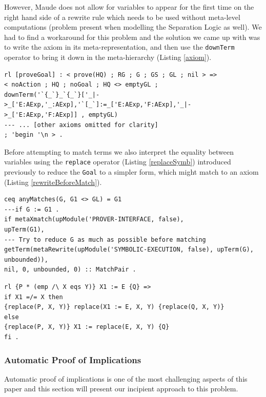\documentclass[12pt,a4paper]{article}
\begin{document}
{	
	However, Maude does not allow for variables to appear for the first time on the right hand side of a rewrite rule which needs to be used without meta-level computations (problem present when modelling the Separation Logic as well). We had to find a workaround for this problem and the solution we came up with was to write the axiom in its meta-representation, and then use the \texttt{downTerm} operator to bring it down in the meta-hierarchy (Listing \ref{axiom}).
	
	\begin{lstlisting}[label=axiom,caption=Initialization of Prover state]
rl [proveGoal] : < prove(HQ) ; RG ; G ; GS ; GL ; nil > =>
< noAction ; HQ ; noGoal ; HQ <> emptyGL ; 
downTerm('`{_`}_`{_`}['_|->_['E:AExp,'_:AExp],'`[_`]:=_['E:AExp,'F:AExp],'_|->_['E:AExp,'F:AExp]] , emptyGL)
--- ... [other axioms omitted for clarity] 
; 'begin '\n > .\end{lstlisting}
Before attempting to match terms we also interpret the equality between variables using the \texttt{replace} operator (Listing \ref{replaceSymb}) introduced previously to reduce the \texttt{Goal} to a simpler form, which might match to an axiom (Listing \ref{rewriteBeforeMatch}).
	\begin{lstlisting}[caption=Equation reducing the goal before attempting to match it,label=rewriteBeforeMatch]
ceq anyMatches(G, G1 <> GL) = G1
---if G := G1 .
if metaXmatch(upModule('PROVER-INTERFACE, false), 
upTerm(G1),
--- Try to reduce G as much as possible before matching
getTerm(metaRewrite(upModule('SYMBOLIC-EXECUTION, false), upTerm(G), unbounded)),
nil, 0, unbounded, 0) :: MatchPair .
	\end{lstlisting} 
	\begin{lstlisting}[caption=Rule intepreting variable equality,label=replaceSymb]
rl {P * (emp /\ X eqs Y)} X1 := E {Q} =>  
if X1 =/= X then 
{replace(P, X, Y)} replace(X1 := E, X, Y) {replace(Q, X, Y)}
else 
{replace(P, X, Y)} X1 := replace(E, X, Y) {Q}
fi .\end{lstlisting}

\subsubsection{Automatic Proof of Implications}
\label{autoImpl}
Automatic proof of implications is one of the most challenging aspects of this paper and this section will present our incipient approach to this problem.

}
\end{document}

